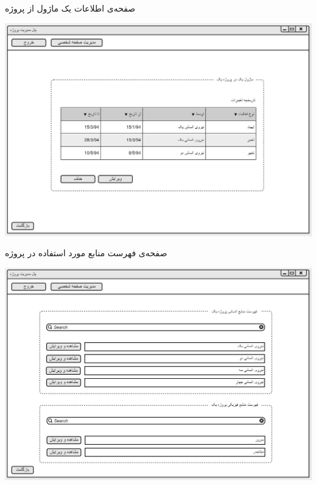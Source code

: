 \vspace{1cm}
صفحه‌ی اطلاعات یک ماژول از پروژه 
\begin{center}
\includegraphics[width=\textwidth]{Prototype/ProjectManager/ModuleInformation.png}
\end{center}

\newpage
\vspace{1cm}
صفحه‌ی فهرست منابع مورد استفاده در پروژه 
\begin{center}
\includegraphics[width=\textwidth]{Prototype/ProjectManager/ProjectResourcesList.png}
\end{center}

